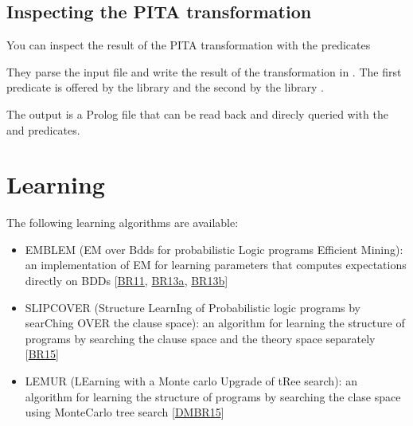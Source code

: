 \documentclass[letterpaper,10pt,english]{sphinxmanual}
\begin{document}
\section{Inspecting the PITA transformation}
\label{\detokenize{index:inspecting-the-pita-transformation}}
\sphinxAtStartPar
You can inspect the result of the PITA transformation with the predicates

\begin{sphinxVerbatim}[commandchars=\\\{\}]
\end{sphinxVerbatim}

\sphinxAtStartPar
They parse the input file  and write the result of the transformation in .
The first predicate is offered by the library  and the second by the library .

\sphinxAtStartPar
The output is a Prolog file that can be read back and direcly queried with the  and
 predicates.


\chapter{Learning}
\label{\detokenize{index:learning}}
\sphinxAtStartPar
The following learning algorithms are available:
\begin{itemize}
\item {} 
\sphinxAtStartPar
EMBLEM (EM over Bdds for probabilistic Logic programs Efficient Mining): an implementation of EM for learning parameters that computes expectations directly on BDDs {[}\hyperlink{cite.index:id60}{BR11}, \hyperlink{cite.index:id65}{BR13a}, \hyperlink{cite.index:id59}{BR13b}{]}

\item {} 
\sphinxAtStartPar
SLIPCOVER (Structure LearnIng of Probabilistic logic programs by searChing OVER the clause space): an algorithm for learning the structure of programs by searching the clause space and the theory space separately {[}\hyperlink{cite.index:id61}{BR15}{]}

\item {} 
\sphinxAtStartPar
LEMUR (LEarning with a Monte carlo Upgrade of tRee search): an algorithm for learning the structure of programs by searching the clase space using Monte\sphinxhyphen{}Carlo tree search {[}\hyperlink{cite.index:id62}{DMBR15}{]}

\end{itemize}
\end{document}

